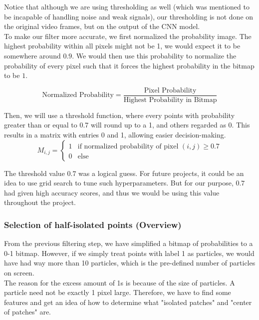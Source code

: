\documentclass[11pt,a4paper]{scrartcl}
\begin{document}
Notice that although we are using thresholding as well (which was mentioned to be incapable of handling noise and weak signals), our thresholding is not done on the original video frames, but on the output of the CNN model. \\ %

To make our filter more accurate, we first normalized the probability image. The highest probability within all pixels might not be 1, we would expect it to be somewhere around $0.9$. We would then use this probability to normalize the probability of every pixel such that it forces the highest probability in the bitmap to be $1$.

$$\text{Normalized Probability} = \frac{\text{Pixel Probability}}{\text{Highest Probability in Bitmap}}$$

Then, we will use a threshold function, where every points with probability greater than or equal to 0.7 will round up to a 1, and others regarded as 0. This results in a matrix with entries 0 and 1, allowing easier decision-making.\\

$$M_{i,j} = \begin{cases}
    1 & \text{if normalized probability of pixel }(i,j) \geq 0.7\\
    0 & \text{else}
\end{cases}$$

The threshold value $0.7$ was a logical guess. For future projects, it could be an idea to use grid search to tune such hyperparameters. But for our purpose, $0.7$ had given high accuracy scores, and thus we would be using this value throughout the project.


\subsubsection{Selection of half-isolated points (Overview)}
From the previous filtering step, we have simplified a bitmap of probabilities to a 0-1 bitmap. However, if we simply treat points with label 1 as particles, we would have had way more than 10 particles, which is the pre-defined number of particles on screen. \\

The reason for the excess amount of 1s is because of the size of particles. A particle need not be exactly 1 pixel large. Therefore, we have to find some features and get an idea of how to determine what "isolated patches" and "center of patches" are.
\end{document}
